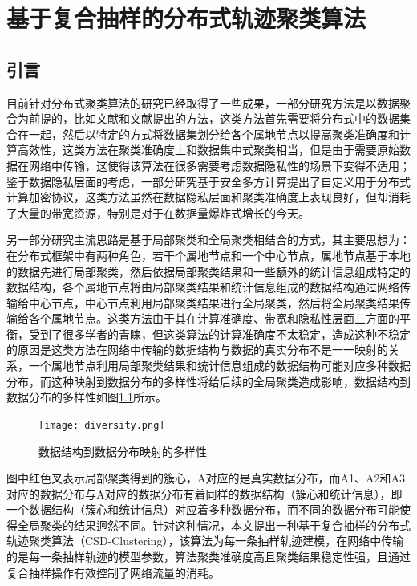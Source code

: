 \chapter{基于复合抽样的分布式轨迹聚类算法}


\section{引言}
目前针对分布式聚类算法的研究已经取得了一些成果，一部分研究方法是以数据聚合为前提的，比如文献\cite{FanA}和文献\cite{Wang2018A}提出的方法，这类方法首先需要将分布式中的数据集合在一起，然后以特定的方式将数据集划分给各个属地节点以提高聚类准确度和计算高效性，这类方法在聚类准确度上和数据集中式聚类相当，但是由于需要原始数据在网络中传输，这使得该算法在很多需要考虑数据隐私性的场景下变得不适用；鉴于数据隐私层面的考虑，一部分研究基于安全多方计算提出了自定义用于分布式计算加密协议，这类方法虽然在数据隐私层面和聚类准确度上表现良好，但却消耗了大量的带宽资源，特别是对于在数据量爆炸式增长的今天。

另一部分研究主流思路是基于局部聚类和全局聚类相结合的方式，其主要思想为：在分布式框架中有两种角色，若干个属地节点和一个中心节点，属地节点基于本地的数据先进行局部聚类，然后依据局部聚类结果和一些额外的统计信息组成特定的数据结构，各个属地节点将由局部聚类结果和统计信息组成的数据结构通过网络传输给中心节点，中心节点利用局部聚类结果进行全局聚类，然后将全局聚类结果传输给各个属地节点。这类方法由于其在计算准确度、带宽和隐私性层面三方面的平衡，受到了很多学者的青睐，但这类算法的计算准确度不太稳定，造成这种不稳定的原因是这类方法在网络中传输的数据结构与数据的真实分布不是一一映射的关系，一个属地节点利用局部聚类结果和统计信息组成的数据结构可能对应多种数据分布，而这种映射到数据分布的多样性将给后续的全局聚类造成影响，数据结构到数据分布的多样性如图\ref{diversity}所示。
\begin{figure}[h]
	\texttt{[image: diversity.png]}
	\caption{数据结构到数据分布映射的多样性}
	\label{diversity}
\end{figure}

图中红色叉表示局部聚类得到的簇心，A对应的是真实数据分布，而A1、A2和A3对应的数据分布与A对应的数据分布有着同样的数据结构（簇心和统计信息），即一个数据结构（簇心和统计信息）对应着多种数据分布，而不同的数据分布可能使得全局聚类的结果迥然不同。针对这种情况，本文提出一种基于复合抽样的分布式轨迹聚类算法（CSD-Clustering），该算法为每一条抽样轨迹建模，在网络中传输的是每一条抽样轨迹的模型参数，算法聚类准确度高且聚类结果稳定性强，且通过复合抽样操作有效控制了网络流量的消耗。


